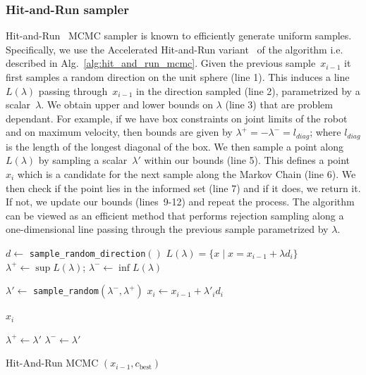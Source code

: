 \documentclass[letterpaper, 10 pt, conference]{ieeeconf}  %
\begin{document}
\subsubsection{Hit-and-Run sampler}

Hit-and-Run~\cite{S84} MCMC sampler is known to efficiently generate uniform samples. Specifically, we use the Accelerated Hit-and-Run variant~\cite{KSZ11} of the algorithm i.e. described in Alg.~\ref{alg:hit_and_run_mcmc}.
Given the previous sample~$x_{i-1}$ it first  samples a random direction on the unit sphere (line 1).
This induces a line~$L(\lambda)$ passing through~$x_{i-1}$ in the direction sampled (line 2), parametrized by a scalar~$\lambda$.
We obtain upper and lower bounds on $\lambda$ (line 3) that are problem dependant. 
For example, if we have box constraints on joint limits of the robot and on maximum velocity, then bounds are given by $\lambda^{+} = -\lambda^{-} = l_{diag}$; where $l_{diag}$ is the length of the longest diagonal of the box.
We then sample a point along~$L(\lambda)$ by sampling a scalar~$\lambda'$ within our bounds (line 5).
This defines a point~$x_{i}$ which is a candidate for the next sample along the Markov Chain (line 6).
We then check if the point lies in the informed set (line 7) and if it does, we return it.
If not, we update our bounds (lines~9-12) and repeat the process.
The algorithm can be viewed as an efficient method that performs rejection sampling along a one-dimensional line passing through the previous sample parametrized by $\lambda$.

\begin{algorithm}[t]
	\begin{algorithmic}[1]
		\STATE $d \leftarrow$ \texttt{sample\_random\_direction}$()$
		\STATE $ L(\lambda) = \{  x \mid x = x_{i-1} + \lambda d_i \} $
		\STATE $ \lambda^{+} \leftarrow \sup L(\lambda) $; 
		\hspace{3mm} 
		$ \lambda^{-} \leftarrow \inf L(\lambda) $
		
		\LOOP
		
		\STATE $ \lambda' \leftarrow$ \texttt{sample\_random}$ (\lambda^{-} , \lambda^{+})$
		\STATE $ x_{i} \leftarrow x_{i-1} + \lambda'_{i} d_i $
		
		\RETURN $ x_{i}$
		\ENDIF
		
		\STATE $ \lambda^{+} \leftarrow \lambda' $
		\ELSE
		\STATE $ \lambda^{-} \leftarrow \lambda'$
		\ENDIF
		
		\ENDLOOP
	\end{algorithmic}
	\caption{Hit-And-Run MCMC $(x_{i-1}, c_{\text{best}})$}
	\label{alg:hit_and_run_mcmc}	
\end{algorithm}
\end{document}
